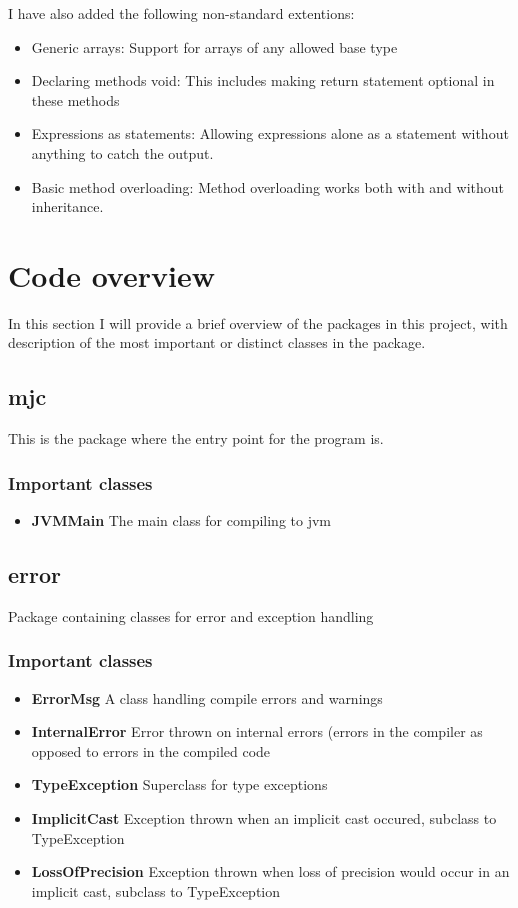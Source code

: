 \documentclass[a4paper,11pt]{article}
\begin{document}
   I have also added the following non-standard extentions:

   \begin{itemize}
      \item Generic arrays: Support for arrays of any allowed base type
      \item Declaring methods void: This includes making return statement optional in these methods
      \item Expressions as statements: Allowing expressions alone as a statement without anything to catch the output.
      \item Basic method overloading: Method overloading works both with and without inheritance.
   \end{itemize}

   \section{Code overview}
   In this section I will provide a brief overview of the packages in this project, with description of the most important or distinct classes in the package.
   \subsection{mjc}
      This is the package where the entry point for the program is.
      \subsubsection{Important classes}
         \begin{itemize}
            \item \textbf{JVMMain} The main class for compiling to jvm
         \end{itemize}
   \subsection{error}
      Package containing classes for error and exception handling
      \subsubsection{Important classes}
         \begin{itemize}
            \item \textbf{ErrorMsg} A class handling compile errors and warnings
            \item \textbf{InternalError} Error thrown on internal errors (errors in the compiler as opposed to errors in the compiled code

            \item \textbf{TypeException} Superclass for type exceptions
            \item \textbf{ImplicitCast} Exception thrown when an implicit cast occured, subclass to TypeException
            \item \textbf{LossOfPrecision} Exception thrown when loss of precision would occur in an implicit cast, subclass to TypeException
         \end{itemize}
\end{document}
